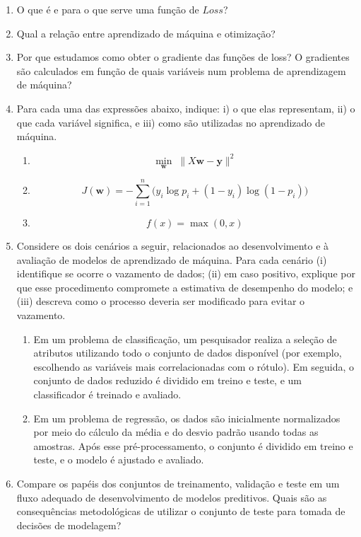 \documentclass[9pt,a4paper]{extarticle}
\newcommand{\bw}{\bm w}
\begin{document}
\begin{enumerate}[label=\textbf{\arabic*)}, itemsep=1.3em]
\item O que é e para o que serve uma função de $Loss$?

\item Qual a relação entre aprendizado de máquina e otimização?

\item Por que estudamos como obter o gradiente das funções de loss? O gradientes são calculados em função de quais variáveis num problema de aprendizagem de máquina?

\item Para cada uma das expressões abaixo, indique:  i) o que elas representam, ii) o que cada variável significa, e iii) como são utilizadas no aprendizado de máquina. 
\begin{enumerate}[label=(\alph*)]
    \item \[ \min_{\bm w}\; \lVert X\bm w - \bm y \rVert^2 \]
    \item \[ J(\bw)= -\sum_{i=1}^n \Big(y_i\log p_i + (1-y_i)\log(1-p_i)\Big) \]
    \item \[ f(x) = \max(0, x) \]

\end{enumerate}


\item Considere os dois cenários a seguir, relacionados ao desenvolvimento e à avaliação de modelos de aprendizado de máquina. Para cada cenário (i) identifique se ocorre o vazamento de dados; (ii) em caso positivo, explique por que esse procedimento compromete a estimativa de desempenho do modelo; e (iii) descreva como o processo deveria ser modificado para evitar o vazamento.

\begin{enumerate}[label=(\alph*)]
    \item Em um problema de classificação, um pesquisador realiza a seleção de atributos utilizando todo o conjunto de dados disponível (por exemplo, escolhendo as variáveis mais correlacionadas com o rótulo). Em seguida, o conjunto de dados reduzido é dividido em treino e teste, e um classificador é treinado e avaliado.

    \item Em um problema de regressão, os dados são inicialmente normalizados por meio do cálculo da média e do desvio padrão usando todas as amostras. Após esse pré-processamento, o conjunto é dividido em treino e teste, e o modelo é ajustado e avaliado.
\end{enumerate}


\item Compare os papéis dos conjuntos de treinamento, validação e teste em um fluxo adequado de desenvolvimento de modelos preditivos. Quais são as consequências metodológicas de utilizar o conjunto de teste para tomada de decisões de modelagem?


\end{enumerate}
\end{document}
